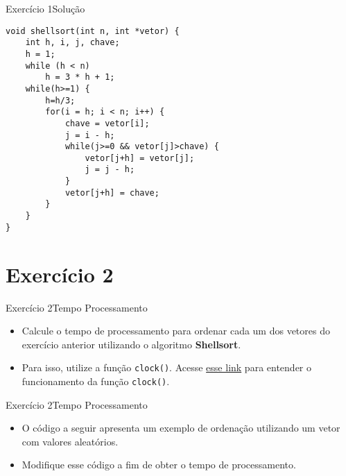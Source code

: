 \documentclass[aspectratio=169]{beamer}
\begin{document}

\begin{frame}[fragile]{Exercício 1}{Solução}
\begin{lstlisting}[style=CStyle]
void shellsort(int n, int *vetor) {
    int h, i, j, chave;
    h = 1;
    while (h < n) 
        h = 3 * h + 1;
    while(h>=1) {
        h=h/3;
        for(i = h; i < n; i++) {
            chave = vetor[i];
            j = i - h;
            while(j>=0 && vetor[j]>chave) {
                vetor[j+h] = vetor[j];
                j = j - h;
            }
            vetor[j+h] = chave;
        }
    }
} 
\end{lstlisting}  
\end{frame}

\section{Exercício 2}

\begin{frame}[fragile]{Exercício 2}{Tempo Processamento}
\begin{itemize}
\item Calcule o tempo de processamento para ordenar cada um dos vetores do exercício anterior utilizando o algoritmo {\bf Shellsort}. 
\item Para isso, utilize a função \verb|clock()|. Acesse \href{http://wurthmann.blogspot.com/2015/04/medir-tempo-de-execucao-em-c.html}{\color{blue} esse link} para entender o funcionamento da função \verb|clock()|.
\end{itemize}
\end{frame}


\begin{frame}[fragile]{Exercício 2}{Tempo Processamento}
\begin{itemize}
\item O código a seguir apresenta um exemplo de ordenação utilizando um vetor com valores aleatórios. 
\item Modifique esse código a fim de obter o tempo de processamento.
\end{itemize}
\end{frame}
\end{document}
